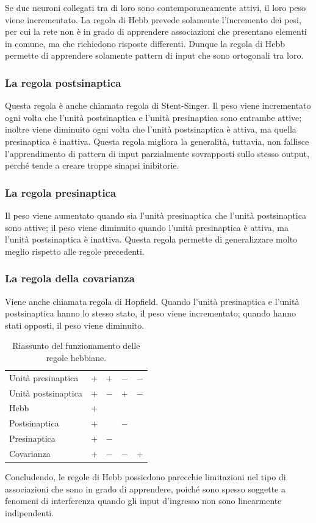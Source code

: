 Se due neuroni collegati tra di loro sono contemporaneamente attivi, il loro
peso viene incrementato. La regola di Hebb prevede solamente l'incremento dei
pesi, per cui la rete non è in grado di apprendere associazioni che presentano
elementi in comune, ma che richiedono risposte differenti. Dunque la regola di
Hebb permette di apprendere solamente pattern di input che sono ortogonali tra
loro.

\subsubsection{La regola postsinaptica}

Questa regola è anche chiamata regola di Stent-Singer. Il peso viene
incrementato ogni volta che l'unità postsinaptica e l'unità presinaptica sono
entrambe attive; inoltre viene diminuito ogni volta che l'unità postsinaptica è
attiva, ma quella presinaptica è inattiva. Questa regola migliora la generalità,
tuttavia, non fallisce l'apprendimento di pattern di input parzialmente
sovrapposti sullo stesso output, perché tende a creare troppe sinapsi
inibitorie.

\subsubsection{La regola presinaptica}

Il peso viene aumentato quando sia l'unità presinaptica che l'unità
postsinaptica sono attive; il peso viene diminuito quando l'unità presinaptica è
attiva, ma l'unità postsinaptica è inattiva. Questa regola permette di
generalizzare molto meglio rispetto alle regole precedenti.

\subsubsection{La regola della covarianza}

Viene anche chiamata regola di Hopfield. Quando l'unità presinaptica e l'unità
postsinaptica hanno lo stesso stato, il peso viene incrementato; quando hanno
stati opposti, il peso viene diminuito.

\begin{table}[H]
	\centering
	\begin{tabular}{lcccc}
		\hline
		Unità presinaptica  & + & +   & $-$ & $-$ \\
		Unità postsinaptica & + & $-$ & +   & $-$ \\
		\hline
		Hebb                & + &     &     &     \\
		Postsinaptica       & + &     & $-$ &     \\
		Presinaptica        & + & $-$ &     &     \\
		Covarianza          & + & $-$ & $-$ & +   \\
		\hline
	\end{tabular}
	\caption{Riassunto del funzionamento delle regole hebbiane.}
\end{table}

Concludendo, le regole di Hebb possiedono parecchie limitazioni nel tipo di
associazioni che sono in grado di apprendere, poiché sono spesso soggette a
fenomeni di interferenza quando gli input d'ingresso non sono linearmente
indipendenti.

